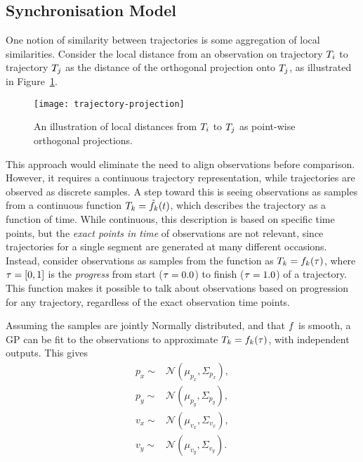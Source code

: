 \subsection{Synchronisation Model}
One notion of similarity between trajectories is some aggregation of
local similarities. Consider the local distance from an observation on trajectory
$T_{i}$ to trajectory $T_{j}$ as the distance of the orthogonal
projection onto $T_{j}$, as illustrated in Figure~\ref{fig:trajectory-projection}.
\begin{figure}
  \centering
  \texttt{[image: trajectory-projection]}
  \caption{An illustration of local distances from $T_i$ to
  $T_j$ as point-wise orthogonal projections.}\label{fig:trajectory-projection}
\end{figure}
This approach would eliminate the need to align observations before
comparison. However, it requires a continuous trajectory
representation, while trajectories are observed as discrete samples.
A step toward this is seeing observations as samples from a continuous function
$T_{k} = \tilde{f}_{k}(t)$, which describes the trajectory as a function of
time. While continuous, this description is based on specific time
points, but the \textit{exact points in time} of observations are not
relevant, since trajectories for a single segment are generated at many different
occasions. Instead, consider observations as samples from the function
as $T_{k} = f_{k}(\tau)$, where $\tau = [0, 1]$ is the \textit{progress} from
start ($\tau = 0.0$) to finish ($\tau = 1.0$) of
a trajectory. This function makes it possible to talk about observations based on
progression for any trajectory, regardless of the exact observation
time points. 

Assuming the samples are jointly Normally distributed, and
that $f$ is smooth, a GP can be fit to the
observations to approximate $T_{k} = f_{k}(\tau)$, with
independent outputs. This gives
\begin{equation}
  \label{eq:f-posterior}
  \begin{split}
  p_x \sim & \mathcal{N}(\mu_{p_x}, \Sigma_{p_x}), \\
  p_y \sim & \mathcal{N}(\mu_{p_y}, \Sigma_{p_y}), \\
  v_x \sim & \mathcal{N}(\mu_{v_x}, \Sigma_{v_x}), \\
  v_y \sim & \mathcal{N}(\mu_{v_y}, \Sigma_{v_y}).
  \end{split}
\end{equation}

